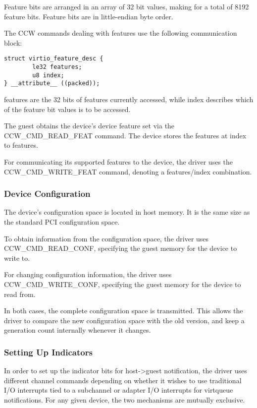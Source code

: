 Feature bits are arranged in an array of 32 bit values, making
for a total of 8192 feature bits. Feature bits are in
little-endian byte order.

The CCW commands dealing with features use the following
communication block:

\begin{lstlisting}
struct virtio_feature_desc {
        le32 features;
        u8 index;
} __attribute__ ((packed));
\end{lstlisting}

features are the 32 bits of features currently accessed, while
index describes which of the feature bit values is to be
accessed.

The guest obtains the device's device feature set via the
CCW_CMD_READ_FEAT command. The device stores the features at index
to features.

For communicating its supported features to the device, the driver
uses the CCW_CMD_WRITE_FEAT command, denoting a features/index
combination.

\subsubsection{Device Configuration}\label{sec:Virtio Transport Options / Virtio over channel I/O / Device Initialization / Device Configuration}

The device's configuration space is located in host memory. It is
the same size as the standard PCI configuration space.

To obtain information from the configuration space, the driver
uses CCW_CMD_READ_CONF, specifying the guest memory for the device
to write to.

For changing configuration information, the driver uses
CCW_CMD_WRITE_CONF, specifying the guest memory for the device to
read from.

In both cases, the complete configuration space is transmitted.  This
allows the driver to compare the new configuration space with the old
version, and keep a generation count internally whenever it changes.

\subsubsection{Setting Up Indicators}\label{sec:Virtio Transport Options / Virtio over channel I/O / Device Initialization / Setting Up Indicators}

In order to set up the indicator bits for host->guest notification,
the driver uses different channel commands depending on whether it
wishes to use traditional I/O interrupts tied to a subchannel or
adapter I/O interrupts for virtqueue notifications. For any given
device, the two mechanisms are mutually exclusive.


